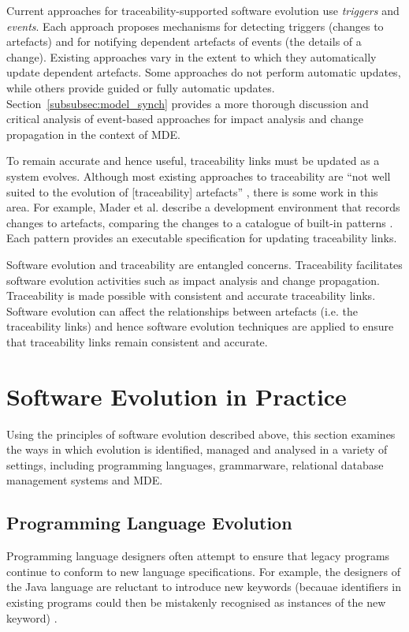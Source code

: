 Current approaches for traceability-supported software evolution use \emph{triggers} and \emph{events}. Each approach proposes mechanisms for detecting triggers (changes to artefacts) and for notifying dependent artefacts of events (the details of a change). Existing approaches vary in the extent to which they automatically update dependent artefacts. Some \cc approaches \cite{chen99consistency,cleland03eventbased} do not perform automatic updates, while others \cite{aizenbud05operational,costa2007rtmdd} provide guided or fully automatic updates. Section~\ref{subsubsec:model_synch} provides a more thorough discussion and critical analysis of event-based approaches for impact analysis and change propagation in the context of MDE.

To remain accurate and hence useful, traceability links must be updated as a system evolves. Although most existing approaches to traceability are ``not well suited to the evolution of [traceability] artefacts'' \cite[pg. 24]{winkler09survey}, there is some work in this area. For example, Mader et al. describe a development environment that records changes to artefacts, comparing the changes to a catalogue of built-in patterns \cite{mader08rule}. Each pattern provides an executable specification for updating traceability links.

Software evolution and traceability are entangled concerns. Traceability facilitates software evolution activities such as impact analysis and change propagation. Traceability is made possible with consistent and accurate traceability links. Software evolution can affect the relationships between artefacts (i.e. the traceability links) and hence software evolution techniques are applied to ensure that traceability links remain consistent and accurate.

\section{Software Evolution in Practice}
\label{sec:software_evolution_practice}
Using the principles of software evolution described above, this section examines the ways in which evolution is identified, managed and analysed in a variety of settings, including programming languages, grammarware, relational database management systems and MDE. 

\subsection{Programming Language Evolution}
Programming language designers often attempt to ensure that legacy programs continue to conform to new language specifications. For \cc example, the designers of the Java \cite{java} language are reluctant to introduce new keywords (becauae identifiers in existing programs could then be mistakenly recognised as instances of the new keyword) \cite{cervelle06tatoo}.

